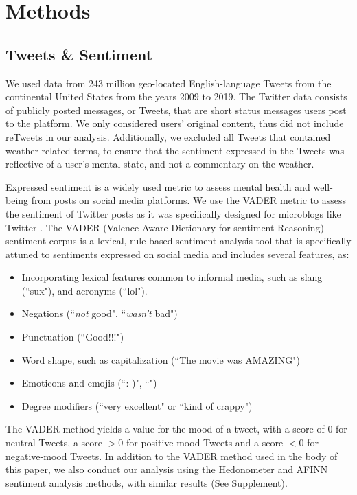 \documentclass[fleqn,10pt]{wlscirep}
\begin{document}
\section*{Methods}
\subsection*{Tweets \& Sentiment}
We used data from 243 million geo-located English-language Tweets from the continental United States from the years 2009 to 2019.  The Twitter data consists of publicly posted messages, or Tweets, that are short status messages users post to the platform.  We only considered users’ original content, thus did not include reTweets in our analysis.  Additionally, we excluded all Tweets that contained weather-related terms, to ensure that the sentiment expressed in the Tweets was reflective of a user's mental state, and not a commentary on the weather.

Expressed sentiment is a widely used metric to assess mental health and well-being from posts on social media platforms.  We use the VADER metric to assess the sentiment of Twitter posts as it was specifically designed for microblogs like Twitter \cite{hutto2014vader}.  The VADER (Valence Aware Dictionary for sentiment Reasoning) sentiment corpus \cite{gilbert_vader_2014} is a lexical, rule-based sentiment analysis tool that is specifically attuned to sentiments expressed on social media and includes several features, as:

\begin{itemize}
  \item Incorporating lexical features common to informal media, such as slang (``sux"), and acronyms (``lol").
  \item Negations (``\textit{not} good", ``\textit{wasn't} bad")
  \item Punctuation (``Good!!!")
  \item Word shape, such as capitalization (``The movie was AMAZING")
  \item Emoticons and emojis (``:-)", ``\emojismile")
  \item Degree modifiers (``very excellent" or ``kind of crappy")
\end{itemize} 

The VADER method yields a value for the mood of a tweet, with a score of 0 for neutral Tweets, a score $> 0$ for positive-mood Tweets and a score $< 0$ for negative-mood Tweets.  In addition to the VADER method used in the body of this paper, we also conduct our analysis using the Hedonometer and AFINN sentiment analysis methods, with similar results (See Supplement).
\end{document}
